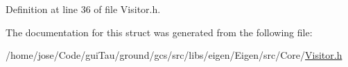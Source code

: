 Definition at line 36 of file Visitor.\-h.



The documentation for this struct was generated from the following file\-:\begin{DoxyCompactItemize}
\item 
/home/jose/\-Code/gui\-Tau/ground/gcs/src/libs/eigen/\-Eigen/src/\-Core/\hyperlink{_visitor_8h}{Visitor.\-h}\end{DoxyCompactItemize}
